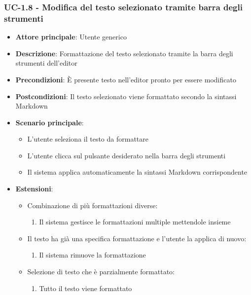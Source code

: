 \documentclass[11pt,a4paper]{article}
\begin{document}
\subsubsection{UC-1.8 - Modifica del testo selezionato tramite barra degli strumenti}
\begin{itemize}
    \item \textbf{Attore principale}: Utente generico
    \item \textbf{Descrizione}: Formattazione del testo selezionato tramite la barra degli strumenti dell'editor
    \item \textbf{Precondizioni}: È presente testo nell'editor pronto per essere modificato
    \item \textbf{Postcondizioni}: Il testo selezionato viene formattato secondo la sintassi Markdown
    \item \textbf{Scenario principale}:
        \begin{itemize}
            \item L'utente seleziona il testo da formattare
            \item L'utente clicca sul pulsante desiderato nella barra degli strumenti
            \item Il sistema applica automaticamente la sintassi Markdown corrispondente
        \end{itemize}
    \item \textbf{Estensioni}:
        \begin{itemize}
            \item Combinazione di più formattazioni diverse:
                \begin{enumerate}
                    \item Il sistema gestisce le formattazioni multiple mettendole insieme
                \end{enumerate}
            \item Il testo ha già una specifica formattazione e l'utente la applica di nuovo:
                \begin{enumerate}
                    \item Il sistema rimuove la formattazione
                \end{enumerate}
            \item Selezione di testo che è parzialmente formattato:
                \begin{enumerate}
                    \item Tutto il testo viene formattato
                \end{enumerate}
        \end{itemize}
\end{itemize}
\end{document}
